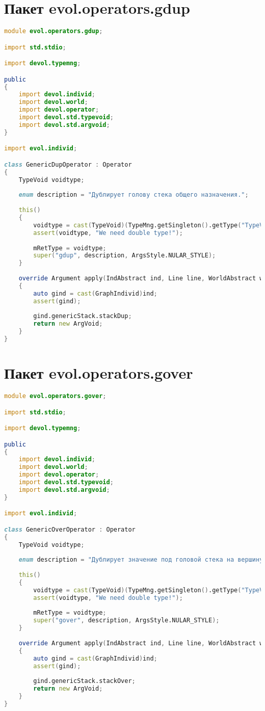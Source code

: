 \documentclass[russian,utf8,emptystyle]{eskdtext}
\begin{document}
\section{Пакет evol.operators.gdup}
\begin{lstlisting}[language=D]
module evol.operators.gdup;

import std.stdio;

import devol.typemng;

public
{
    import devol.individ;
    import devol.world;
    import devol.operator;
    import devol.std.typevoid;
    import devol.std.argvoid;
}

import evol.individ;

class GenericDupOperator : Operator
{
    TypeVoid voidtype;
    
    enum description = "Дублирует голову стека общего назначения.";
    
    this()
    {
        voidtype = cast(TypeVoid)(TypeMng.getSingleton().getType("TypeVoid"));
        assert(voidtype, "We need double type!");
        
        mRetType = voidtype;
        super("gdup", description, ArgsStyle.NULAR_STYLE);
    }
    
    override Argument apply(IndAbstract ind, Line line, WorldAbstract world)
    {
        auto gind = cast(GraphIndivid)ind;
        assert(gind);
        
        gind.genericStack.stackDup;
        return new ArgVoid;
    }   
}
\end{lstlisting}

\section{Пакет evol.operators.gover}
\begin{lstlisting}[language=D]
module evol.operators.gover;

import std.stdio;

import devol.typemng;

public
{
    import devol.individ;
    import devol.world;
    import devol.operator;
    import devol.std.typevoid;
    import devol.std.argvoid;
}

import evol.individ;

class GenericOverOperator : Operator
{
    TypeVoid voidtype;
    
    enum description = "Дублирует значение под головой стека на вершину. Стек общего назначения.";
    
    this()
    {
        voidtype = cast(TypeVoid)(TypeMng.getSingleton().getType("TypeVoid"));
        assert(voidtype, "We need double type!");
        
        mRetType = voidtype;
        super("gover", description, ArgsStyle.NULAR_STYLE);
    }
    
    override Argument apply(IndAbstract ind, Line line, WorldAbstract world)
    {
        auto gind = cast(GraphIndivid)ind;
        assert(gind);
        
        gind.genericStack.stackOver;
        return new ArgVoid;
    }   
}
\end{lstlisting}
\end{document}

